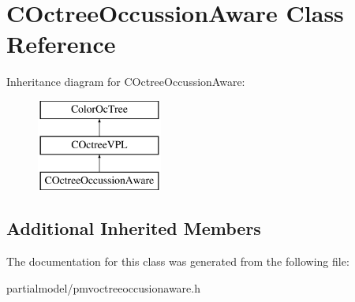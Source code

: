 \hypertarget{classCOctreeOccussionAware}{}\section{C\+Octree\+Occussion\+Aware Class Reference}
\label{classCOctreeOccussionAware}
Inheritance diagram for C\+Octree\+Occussion\+Aware\+:\begin{figure}[H]
\begin{center}
\leavevmode
\includegraphics[height=3.000000cm]{classCOctreeOccussionAware}
\end{center}
\end{figure}
\subsection*{Additional Inherited Members}


The documentation for this class was generated from the following file\+:\begin{DoxyCompactItemize}
\item 
partialmodel/pmvoctreeoccusionaware.\+h\end{DoxyCompactItemize}
